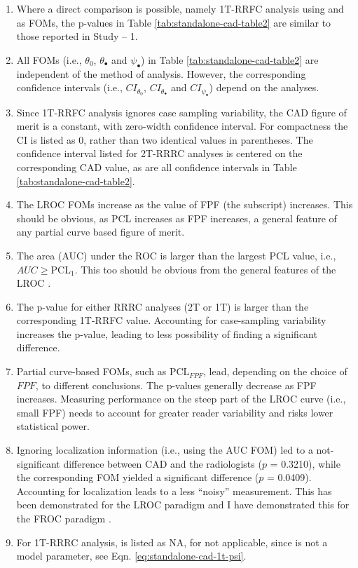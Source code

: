 \documentclass[
]{book}
\providecommand{\tightlist}{%
  \setlength{\itemsep}{0pt}\setlength{\parskip}{0pt}}
\begin{document}
\begin{enumerate}
\def\labelenumi{\arabic{enumi}.}
\tightlist
\item
  Where a direct comparison is possible, namely 1T-RRFC analysis using and as FOMs, the p-values in Table \ref{tab:standalone-cad-table2} are similar to those reported in Study -- 1.
\item
  All FOMs (i.e., \(\theta_0\), \(\theta_{\bullet}\) and \(\psi_{\bullet}\)) in Table \ref{tab:standalone-cad-table2} are independent of the method of analysis. However, the corresponding confidence intervals (i.e., \(CI_{\theta_0}\), \(CI_{\theta_{\bullet}}\) and \(CI_{\psi_{\bullet}}\)) depend on the analyses.
\item
  Since 1T-RRFC analysis ignores case sampling variability, the CAD figure of merit is a constant, with zero-width confidence interval. For compactness the CI is listed as 0, rather than two identical values in parentheses. The confidence interval listed for 2T-RRRC analyses is centered on the corresponding CAD value, as are all confidence intervals in Table \ref{tab:standalone-cad-table2}.
\item
  The LROC FOMs increase as the value of FPF (the subscript) increases.
  This should be obvious, as PCL increases as FPF increases, a general feature of any partial curve based figure of merit.
\item
  The area (AUC) under the ROC is larger than the largest PCL value, i.e., \(AUC \geq \text{PCL}_1\). This too should be obvious from the general features of the LROC \citep{swensson1996unified}.
\item
  The p-value for either RRRC analyses (2T or 1T) is larger than the corresponding 1T-RRFC value. Accounting for case-sampling variability increases the p-value, leading to less possibility of finding a significant difference.
\item
  Partial curve-based FOMs, such as \(\text{PCL}_{FPF}\), lead, depending on the choice of \(FPF\), to different conclusions. The p-values generally decrease as FPF increases. Measuring performance on the steep part of the LROC curve (i.e., small FPF) needs to account for greater reader variability and risks lower statistical power.
\item
  Ignoring localization information (i.e., using the AUC FOM) led to a not-significant difference between CAD and the radiologists (\(p\) = 0.3210), while the corresponding FOM yielded a significant difference (\(p\) = 0.0409). Accounting for localization leads to a less ``noisy'' measurement. This has been demonstrated for the LROC paradigm \citep{swensson1996unified} and I have demonstrated this for the FROC paradigm \citep{chakraborty2008validation}.
\item
  For 1T-RRRC analysis, is listed as NA, for not applicable, since is not a model parameter, see Eqn. \eqref{eq:standalone-cad-1t-psi}.
\end{enumerate}
\end{document}
